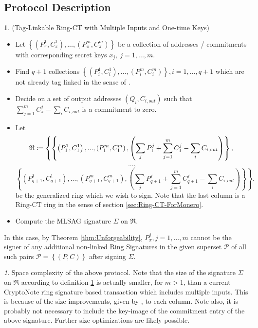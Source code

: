 \documentclass[12pt,oneside,english]{amsart}
\numberwithin{equation}{section}
\numberwithin{figure}{section}
\theoremstyle{plain}
\theoremstyle{plain}
\theoremstyle{remark}
\newtheorem{rem}[thm]{\protect\remarkname}
\theoremstyle{plain}
\theoremstyle{remark}
\theoremstyle{remark}
\theoremstyle{plain}
\theoremstyle{definition}
\newtheorem{defn}[thm]{\protect\definitionname}
\providecommand{\definitionname}{Definition}
\providecommand{\remarkname}{Remark}
\begin{document}
\subsection{Protocol Description}
\begin{defn}
\label{RCTProtocol}(Tag-Linkable Ring-CT with
Multiple Inputs and One-time Keys) \end{defn}
\begin{itemize}
\item Let $\left\{ \left(P_{\pi}^{1},C_{\pi}^{1}\right),...,\left(P_{\pi}^{m},C_{\pi}^{m}\right)\right\} $
be a collection of addresses / commitments with corresponding secret
keys $x_{j},\ j=1,...,m$. 
\item Find $q+1$ collections $\left\{ \left(P_{i}^{1},C_{i}^{1}\right),...,\left(P_{i}^{m},C_{i}^{m}\right)\right\} ,i=1,...,q+1$
which are not already tag linked in the sense of \cite[page 6]{FS}. 
\item Decide on a set of output addresses $\left(Q_{i},C_{i,out}\right)$
such that $\sum_{j=1}^{m}C_{\pi}^{j}-\sum_{i}C_{i,out}$ is a commitment
to zero. 
\item Let 
\[
\mbox{\ensuremath{\mathfrak{R}}}\coloneqq\left\{ \left\{ \left(P_{1}^{1},C_{1}^{1}\right),...,\left(P_{1}^{m},C_{1}^{m}\right),\left(\sum_{j}P_{1}^{j}+\sum_{j=1}^{m}C_{1}^{j}-\sum_{i}C_{i,out}\right)\right\} ,\right.
\]
\[
...,
\]
\[
\left.\left\{ \left(P_{q+1}^{1},C_{q+1}^{1}\right),...,\left(P_{q+1}^{m},C_{q+1}^{m}\right),\left(\sum_{j}P_{q+1}^{j}+\sum_{j=1}^{m}C_{q+1}^{j}-\sum_{i}C_{i,out}\right)\right\} \right\} .
\]
 be the generalized ring which we wish to sign. Note that the last
column is a Ring-CT ring in the sense of section \ref{sec:Ring-CT-ForMonero}. 
\item Compute the MLSAG signature $\Sigma$ on $\mathfrak{R}.$
\end{itemize}
In this case, by Theorem \ref{thm:Unforgeability}, $P_{\pi}^{j},j=1,...,m$ cannot be the signer of any
additional non-linked Ring Signatures in the given superset $\mathcal{P}$
of all such pairs $\mathcal{P}=\left\{ \left(P,C\right)\right\} $
after signing $\Sigma$. 
\begin{rem}
Space complexity of the above protocol. Note that the size of the
signature $\Sigma$ on $\mathfrak{R}$ according to definition \ref{RCTProtocol}
is actually smaller, for $m>1$, than a current CryptoNote \cite{CN}
ring signature based transaction which includes multiple inputs. This
is because of the size improvements, given by \cite{LWW}, to each
column. Note also, it is probably not necessary to include the key-image
of the commitment entry of the above signature. Further size optimizations
are likely possible.\end{rem}
\end{document}

